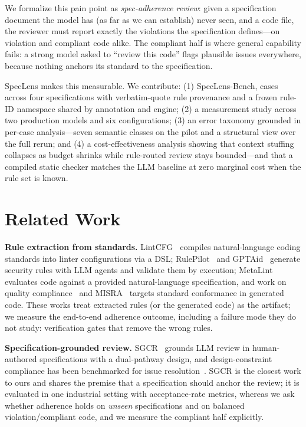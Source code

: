 \documentclass[11pt]{article}
\begin{document}
We formalize this pain point as \emph{spec-adherence review}: given a
specification document the model has (as far as we can establish) never seen,
and a code file, the reviewer must report exactly the violations the
specification defines---on violation and compliant code alike. The compliant
half is where general capability fails: a strong model asked to ``review this
code'' flags plausible issues everywhere, because nothing anchors its standard
to the specification.

SpecLens makes this measurable. We contribute: (1) SpecLens-Bench, \benchN{} cases
across four specifications with verbatim-quote rule provenance and a frozen
rule-ID namespace shared by annotation and engine; (2) a measurement study
across two production models and six configurations; (3) an error taxonomy
grounded in per-case analysis---seven semantic classes on the pilot and a
structural view over the full rerun; and (4) a cost-effectiveness analysis
showing that context stuffing collapses as budget shrinks while rule-routed
review stays bounded---and that a compiled static checker matches the LLM
baseline at zero marginal cost when the rule set is known.

\section{Related Work}
\textbf{Rule extraction from standards.} LintCFG~\cite{lintcfg2026} compiles
natural-language coding standards into linter configurations via a DSL;
RulePilot~\cite{rulepilot2025} and GPTAid~\cite{gptaid2025} generate security
rules with LLM agents and validate them by execution; MetaLint~\cite{metalint2025}
evaluates code against a provided natural-language specification, and work on
quality compliance~\cite{qualitycompliance2025} and MISRA~\cite{misra2025}
targets standard conformance in generated code. These works treat extracted
rules (or the generated code) as the artifact; we measure the end-to-end
adherence outcome, including a failure mode they do not study: verification
gates that remove the wrong rules.

\textbf{Specification-grounded review.} SGCR~\cite{sgcr2025} grounds LLM review
in human-authored specifications with a dual-pathway design, and
design-constraint compliance has been benchmarked for issue
resolution~\cite{designconstraint2026}. SGCR is the closest work to ours and
shares the premise that a specification should anchor the review; it is
evaluated in one industrial setting with acceptance-rate metrics, whereas we
ask whether adherence holds on \emph{unseen} specifications and on balanced
violation/compliant code, and we measure the compliant half explicitly.
\end{document}
